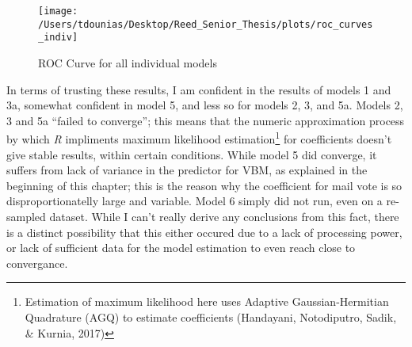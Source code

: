 \documentclass[12pt,twoside]{reedthesis}
\begin{document}
  \begin{figure}
  
  {\centering \texttt{[image: /Users/tdounias/Desktop/Reed\_Senior\_Thesis/plots/roc\_curves\_indiv]} 
  
  }
  
  \caption[ROC Curve for all individual models]{ROC Curve for all individual models}\label{fig:roc the curves}
  \end{figure}
  
  In terms of trusting these results, I am confident in the results of
  models 1 and 3a, somewhat confident in model 5, and less so for models
  2, 3, and 5a. Models 2, 3 and 5a ``failed to converge''; this means that
  the numeric approximation process by which \textit{R} impliments maximum
  likelihood estimation\footnote{Estimation of maximum likelihood here
    uses Adaptive Gaussian-Hermitian Quadrature (AGQ) to estimate
    coefficients (Handayani, Notodiputro, Sadik, \& Kurnia, 2017)} for
  coefficients doesn't give stable results, within certain conditions.
  While model 5 did converge, it suffers from lack of variance in the
  predictor for VBM, as explained in the beginning of this chapter; this
  is the reason why the coefficient for mail vote is so
  disproportionatelly large and variable. Model 6 simply did not run, even
  on a re-sampled dataset. While I can't really derive any conclusions
  from this fact, there is a distinct possibility that this either occured
  due to a lack of processing power, or lack of sufficient data for the
  model estimation to even reach close to convergance.
  
\end{document}
